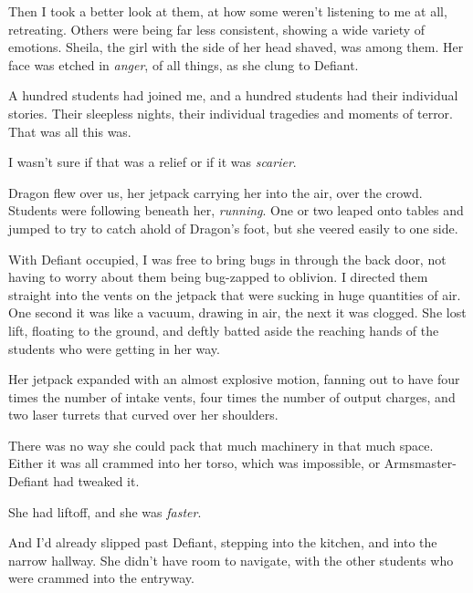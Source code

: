 Then I took a better look at them, at how some weren't listening to me at all, retreating.  Others were being far less consistent, showing a wide variety of emotions.  Sheila, the girl with the side of her head shaved, was among them.  Her face was etched in \emph{anger}, of all things, as she clung to Defiant.



A hundred students had joined me, and a hundred students had their individual stories.  Their sleepless nights, their individual tragedies and moments of terror.  That was all this was.



I wasn't sure if that was a relief or if it was \emph{scarier}.



Dragon flew over us, her jetpack carrying her into the air, over the crowd.  Students were following beneath her, \emph{running}.  One or two leaped onto tables and jumped to try to catch ahold of Dragon's foot, but she veered easily to one side.



With Defiant occupied, I was free to bring bugs in through the back door, not having to worry about them being bug-zapped to oblivion.  I directed them straight into the vents on the jetpack that were sucking in huge quantities of air.  One second it was like a vacuum, drawing in air, the next it was clogged.  She lost lift, floating to the ground, and deftly batted aside the reaching hands of the students who were getting in her way.



Her jetpack expanded with an almost explosive motion, fanning out to have four times the number of intake vents, four times the number of output charges, and two laser turrets that curved over her shoulders.



There was no way she could pack that much machinery in that much space.  Either it was all crammed into her torso, which was impossible, or Armsmaster-Defiant had tweaked it.



She had liftoff, and she was \emph{faster}.



And I'd already slipped past Defiant, stepping into the kitchen, and into the narrow hallway.  She didn't have room to navigate, with the other students who were crammed into the entryway.



